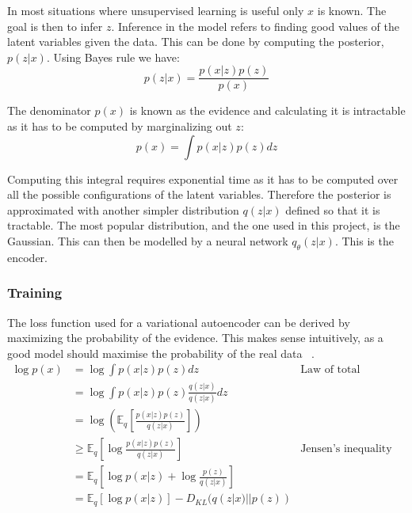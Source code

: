 \documentclass[12pt,a4paper,twoside,openright]{report}
\begin{document}
In most situations where unsupervised learning is useful only $x$ is known. The goal is then to infer $z$.
Inference in the model refers to finding good values of the latent variables given the data. This can be done by computing the
posterior, $p(z|x)$. Using Bayes rule we have:
\begin{equation}
  p(z|x) = \frac{p(x|z)p(z)}{p(x)}
\end{equation}

The denominator $p(x)$ is known as the evidence and calculating it is intractable as it has to be computed by marginalizing out $z$:
\begin{equation}
  p(x) = \int p(x|z)p(z) dz
\end{equation}

Computing this integral requires exponential time as it has to be computed over all the possible configurations of
the latent variables. Therefore the posterior is approximated with another simpler distribution $q(z|x)$ defined so that it is 
tractable. The most popular distribution, and the one used in this project, is the Gaussian.
This can then be modelled by a neural network $q_\theta(z|x)$. This is the encoder.

\subsubsection{Training}

The loss function used for a variational autoencoder can be derived by maximizing the probability of the evidence.
This makes sense intuitively, as a good model should maximise the probability of the real data ~\cite{SVIPartI90:online}.
\begingroup
\allowdisplaybreaks
\begin{align*}
  \log p(x) & = \log \int p(x|z)p(z) dz &\text{Law of total probability}\\
  & = \log \int p(x|z)p(z) \frac{q(z|x)}{q(z|x)} dz\\
  & = \log\left(\mathbb{E}_q \left[\frac{p(x|z)p(z)}{q(z|x)}\right]\right) \\
  & \geq \mathbb{E}_q \left[\log\frac{p(x|z)p(z)}{q(z|x)}\right] &\text{Jensen's inequality}\\
  & = \mathbb{E}_q \left[\log p(x|z) + \log\frac{p(z)}{q(z|x)}\right] \\
  & = \mathbb{E}_q [\log p(x|z)] - D_{KL}(q(z|x)||p(z))
\end{align*}
\endgroup
\end{document}
